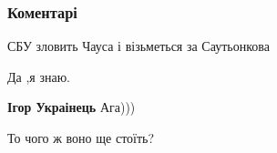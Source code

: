  
 
 
 
 
\subsubsection{Коментарі}
\label{sec:01_08_2021.fb.donosjan_nikolaj.1.stela_jazyk_lymanske.cmt}

\begin{itemize}
 
СБУ зловить Чауса і візьметься за Саутьонкова

\begin{itemize}
 
Да ,я знаю.

 
\textbf{Ігор Украінець} Ага)))
\end{itemize}

 
То чого ж воно ще стоїть?

\begin{itemize}
 

\end{itemize}
\end{itemize}
